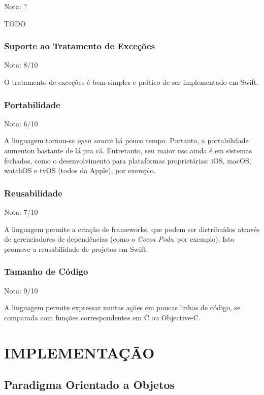 \documentclass[rel_mlp]{iiufrgs}
\begin{document}
Nota: ?

TODO

\subsection{Suporte ao Tratamento de Exceções}

Nota: 8/10

O tratamento de exceções é bem simples e prático de ser implementado em Swift.

\subsection{Portabilidade}

Nota: 6/10

A linguagem tornou-se \textit{open source} há pouco tempo. Portanto, a portabilidade aumentou bastante de lá pra cá. Entretanto, seu maior uso ainda é em sistemas fechados, como o desenvolvimento para plataformas proprietárias: iOS, macOS, watchOS e tvOS (todos da Apple), por exemplo.

\subsection{Reusabilidade}

Nota: 7/10

A linguagem permite a criação de frameworks, que podem ser distribuídos através de gerenciadores de dependências (como o \textit{Cocoa Pods}, por exemplo). Isto promove a reusabilidade de projetos em Swift.

\subsection{Tamanho de Código}

Nota: 9/10

A linguagem permite expressar muitas ações em poucas linhas de código, se comparada com funções correspondentes em C ou Objective-C.




\chapter{IMPLEMENTAÇÃO} \label{intro}

\section{Paradigma Orientado a Objetos} \label{intro}
\end{document}

